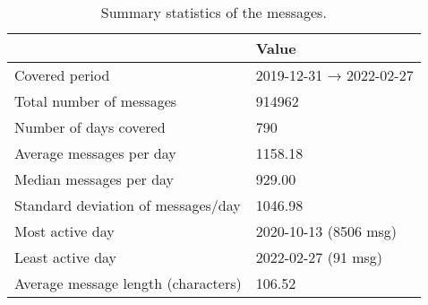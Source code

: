 \begin{table}
\caption{Summary statistics of the messages.}
\label{tbl:msg_stats}
\begin{tabular}{ll}
\toprule
 & Value \\
\midrule
Covered period & 2019-12-31 → 2022-02-27 \\
Total number of messages & 914962 \\
Number of days covered & 790 \\
Average messages per day & 1158.18 \\
Median messages per day & 929.00 \\
Standard deviation of messages/day & 1046.98 \\
Most active day & 2020-10-13 (8506 msg) \\
Least active day & 2022-02-27 (91 msg) \\
Average message length (characters) & 106.52 \\
\bottomrule
\end{tabular}
\end{table}
